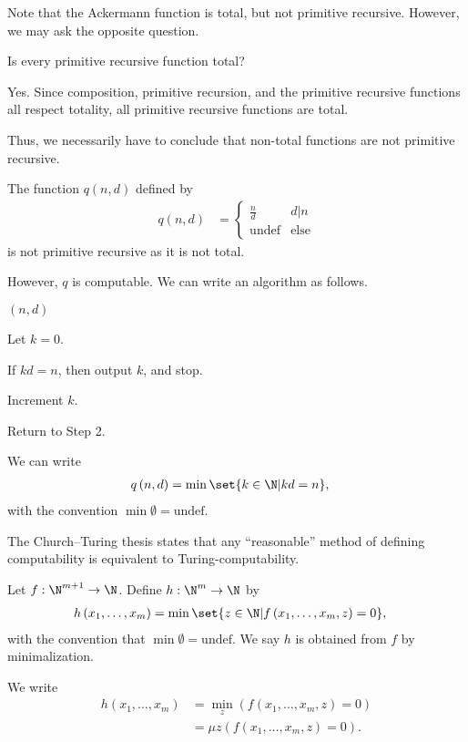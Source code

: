 \documentclass[10pt]{mypackage}
\begin{document}
Note that the Ackermann function is total, but not primitive recursive. However, we may ask the opposite question.
\begin{question}
  Is every primitive recursive function total?
\end{question}
\begin{answer}
  Yes. Since composition, primitive recursion, and the primitive recursive functions all respect totality, all primitive recursive functions are total.
\end{answer}
Thus, we necessarily have to conclude that non-total functions are not primitive recursive.
\begin{example}
  The function $q\left(n,d\right) $ defined by
  \begin{align*}
    q\left(n,d\right) &= \begin{cases}
      \frac{n}{d} & d|n\\
      \text{undef} & \text{else}
    \end{cases}
  \end{align*}
  is not primitive recursive as it is not total.\newline

  However, $q$ is computable. We can write an algorithm as follows.
  \begin{description}[font=\normalfont\scshape]\itemsep=-2pt
    \item[Input:] $\left(n,d\right)$
    \item[Step 1:] Let $k = 0$.
    \item[Step 2:] If $kd = n$, then output $k$, and stop.
    \item[Step 3:] Increment $k$.
    \item[Step 4:] Return to Step 2.
  \end{description}
  We can write
  \begin{align*}
    q\left(n,d\right) &= \min\set{k\in\N | kd = n},
  \end{align*}
  with the convention $\min\emptyset = \text{undef}$.
\end{example}
\begin{remark}
The Church--Turing thesis states that any ``reasonable'' method of defining computability is equivalent to Turing-computability.
\end{remark}
\begin{definition}
  Let $f: \N^{m+1}\rightarrow \N$. Define $h: \N^{m}\rightarrow \N$ by
  \begin{align*}
    h\left(x_1,\dots,x_m\right) &= \min\set{z\in \N| f\left(x_1,\dots,x_m,z\right) = 0},
  \end{align*}
  with the convention that $\min\emptyset = \text{undef}$. We say $h$ is obtained from $f$ by minimalization.\newline

  We write
  \begin{align*}
    h\left(x_1,\dots,x_m\right) &= \min_{z}\left(f\left(x_1,\dots,x_m,z\right) = 0\right)\\
                                &= \mu z \left(f\left(x_1,\dots,x_m,z\right) = 0\right).
  \end{align*}
\end{definition}
\end{document}
